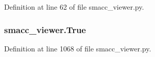 Definition at line 62 of file smacc\+\_\+viewer.\+py.

\subsubsection[{\texorpdfstring{True}{True}}]{\setlength{\rightskip}{0pt plus 5cm}smacc\+\_\+viewer.\+True}\hypertarget{namespacesmacc__viewer_a48e3092f51d8fc570fcb3d6c76e27f3b}{}\label{namespacesmacc__viewer_a48e3092f51d8fc570fcb3d6c76e27f3b}


Definition at line 1068 of file smacc\+\_\+viewer.\+py.

